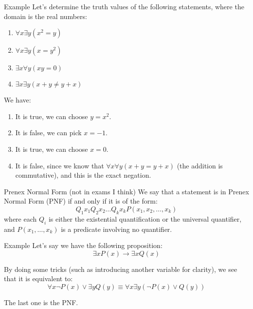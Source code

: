\documentclass{article}
\begin{document}
\begin{parag}{Example}
    Let's determine the truth values of the following statements, where the domain is the real numbers:
    \begin{enumerate}
        \item $\forall x \exists y\left(x^2 = y\right)$
        \item $\forall x \exists y \left(x = y^2\right)$
        \item $\exists x \forall y\left(xy = 0\right)$
        \item $\exists x \exists y\left(x + y \neq y + x\right)$
    \end{enumerate}
    
    We have:
    \begin{enumerate}
        \item It is true, we can choose $y = x^2$.
        \item It is false, we can pick $x = -1$.
        \item It is true, we can choose $x = 0$.
        \item It is false, since we know that $\forall x \forall y\left(x + y = y + x\right)$ (the addition is commutative), and this is the exact negation.
    \end{enumerate}
    
\end{parag}

\begin{parag}{Prenex Normal Form (not in exams I think)}
    We say that a statement is in Prenex Normal Form (PNF) if and only if it is of the form: 
    \[Q_1 x_1 Q_2 x_2 \ldots Q_k x_k P\left(x_1, x_2, \ldots, x_k\right)\]
    where each $Q_i$ is either the existential quantification or the universal quantifier, and $P\left(x_1, \ldots, x_k\right)$ is a predicate involving no quantifier.

    \begin{subparag}{Example}
        Let's say we have the following proposition: 
        \[\exists x P\left(x\right) \to \exists x Q\left(x\right)\]
        
        By doing some tricks (such as introducing another variable for clarity), we see that it is equivalent to: 
        \[\forall x \lnot P\left(x\right) \lor \exists y Q\left(y\right) \equiv \forall x \exists y\left(\lnot P\left(x\right) \lor Q\left(y\right)\right)\]

        The last one is the PNF.
    \end{subparag}
    
\end{parag}
\end{document}
